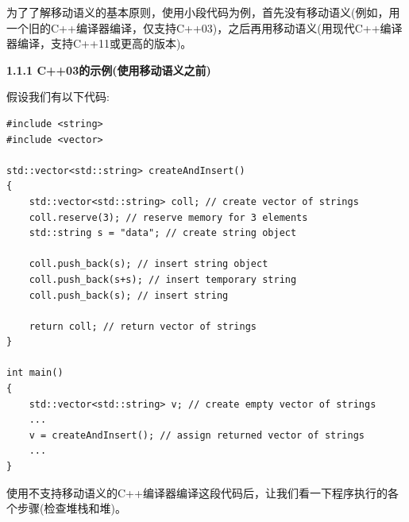为了了解移动语义的基本原则，使用小段代码为例，首先没有移动语义(例如，用一个旧的C++编译器编译，仅支持C++03)，之后再用移动语义(用现代C++编译器编译，支持C++11或更高的版本)。\par

\hspace*{\fill} \par %
\textbf{1.1.1 C++03的示例(使用移动语义之前)}

假设我们有以下代码:\par

{\color{red}{basics/motiv03.cpp}}

\begin{lstlisting}[caption={}]
#include <string>
#include <vector>

std::vector<std::string> createAndInsert()
{
	std::vector<std::string> coll; // create vector of strings
	coll.reserve(3); // reserve memory for 3 elements
	std::string s = "data"; // create string object
	
	coll.push_back(s); // insert string object
	coll.push_back(s+s); // insert temporary string
	coll.push_back(s); // insert string
	
	return coll; // return vector of strings
}

int main()
{
	std::vector<std::string> v; // create empty vector of strings
	...
	v = createAndInsert(); // assign returned vector of strings
	...
}
\end{lstlisting}

使用不支持移动语义的C++编译器编译这段代码后，让我们看一下程序执行的各个步骤(检查堆栈和堆)。\par

